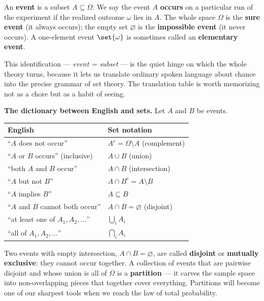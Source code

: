 \begin{definition}[Event]
\label{ch03:def-event}
An \textbf{event} is a subset $A \subseteq \Omega$. We say the event $A$
\textbf{occurs} on a particular run of the experiment if the realized outcome
$\omega$ lies in $A$. The whole space $\Omega$ is the \textbf{sure event} (it
always occurs); the empty set $\varnothing$ is the \textbf{impossible event} (it
never occurs). A one-element event $\set{\omega}$ is sometimes called an
\textbf{elementary event}.
\end{definition}

This identification --- \emph{event = subset} --- is the quiet hinge on which
the whole theory turns, because it lets us translate ordinary spoken language
about chance into the precise grammar of set theory. The translation table is
worth memorizing not as a chore but as a habit of seeing.

\begin{focusbox}
\textbf{The dictionary between English and sets.} Let $A$ and $B$ be events.
\begin{center}
\begin{tabular}{@{}ll@{}}
\toprule
\textbf{English} & \textbf{Set notation} \\
\midrule
``$A$ does not occur'' & $A^c = \Omega \setminus A$ (complement) \\
``$A$ or $B$ occurs'' (inclusive) & $A \cup B$ (union) \\
``both $A$ and $B$ occur'' & $A \cap B$ (intersection) \\
``$A$ but not $B$'' & $A \cap B^c = A \setminus B$ \\
``$A$ implies $B$'' & $A \subseteq B$ \\
``$A$ and $B$ cannot both occur'' & $A \cap B = \varnothing$ (disjoint) \\
``at least one of $A_1, A_2, \dots$'' & $\bigcup_i A_i$ \\
``all of $A_1, A_2, \dots$'' & $\bigcap_i A_i$ \\
\bottomrule
\end{tabular}
\end{center}
\end{focusbox}

Two events with empty intersection, $A \cap B = \varnothing$, are called
\textbf{disjoint} or \textbf{mutually exclusive}: they cannot occur together. A
collection of events that are pairwise disjoint and whose union is all of
$\Omega$ is a \textbf{partition} --- it carves the sample space into
non-overlapping pieces that together cover everything. Partitions will become one
of our sharpest tools when we reach the law of total probability.

